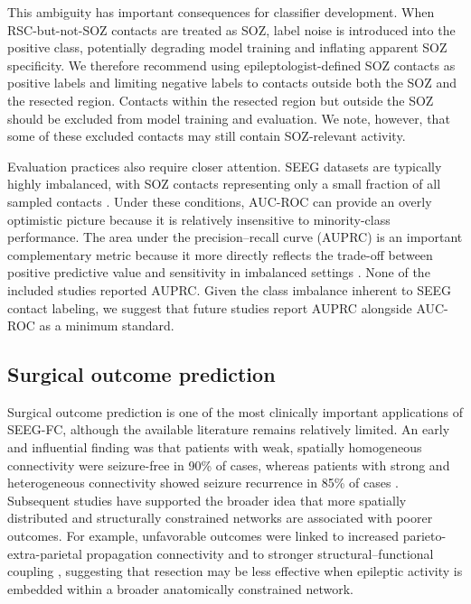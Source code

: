 \documentclass[12pt]{article}
\begin{document}
This ambiguity has important consequences for classifier development. When RSC-but-not-SOZ contacts are treated as SOZ, label noise is introduced into the positive class, potentially degrading model training and inflating apparent SOZ specificity. We therefore recommend using epileptologist-defined SOZ contacts as positive labels and limiting negative labels to contacts outside both the SOZ and the resected region. Contacts within the resected region but outside the SOZ should be excluded from model training and evaluation. We note, however, that some of these excluded contacts may still contain SOZ-relevant activity.

Evaluation practices also require closer attention. SEEG datasets are typically highly imbalanced, with SOZ contacts representing only a small fraction of all sampled contacts \cite{Hrtonova2025-og}. Under these conditions, AUC-ROC can provide an overly optimistic picture because it is relatively insensitive to minority-class performance. The area under the precision--recall curve (AUPRC) is an important complementary metric because it more directly reflects the trade-off between positive predictive value and sensitivity in imbalanced settings \cite{Saito2015-kq}. None of the included studies reported AUPRC. Given the class imbalance inherent to SEEG contact labeling, we suggest that future studies report AUPRC alongside AUC-ROC as a minimum standard.

\subsection{Surgical outcome prediction}

Surgical outcome prediction is one of the most clinically important applications of SEEG-FC, although the available literature remains relatively limited. An early and influential finding was that patients with weak, spatially homogeneous connectivity were seizure-free in 90\% of cases, whereas patients with strong and heterogeneous connectivity showed seizure recurrence in 85\% of cases \cite{Antony2013-jw}. Subsequent studies have supported the broader idea that more spatially distributed and structurally constrained networks are associated with poorer outcomes. For example, unfavorable outcomes were linked to increased parieto-extra-parietal propagation connectivity \cite{Fonti2021-dz} and to stronger structural--functional coupling \cite{Chang2023-bc}, suggesting that resection may be less effective when epileptic activity is embedded within a broader anatomically constrained network.
\end{document}
